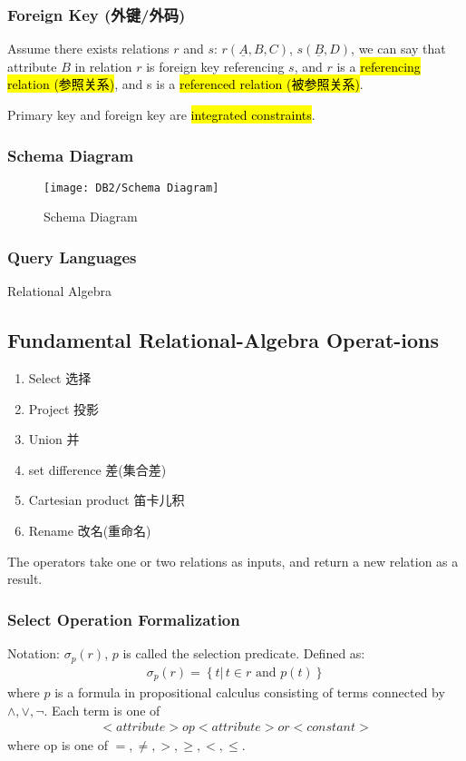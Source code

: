 \subsubsection{Foreign Key (外键/外码)}
Assume there exists relations $r$ and $s$: $r(\underline{A}, B, C)$, $s(\underline{B}, D)$, we can say that attribute $B$ in relation $r$ is foreign key referencing $s$, and $r$ is a \hl{referencing relation (参照关系)}, and s is a \hl{referenced relation (被参照关系)}. 

Primary key and foreign key are \hl{integrated constraints}.

\subsubsection{Schema Diagram}
\begin{figure}[H]
    \centering
    \texttt{[image: DB2/Schema Diagram]}
    \caption{Schema Diagram}
\end{figure}

\subsubsection{Query Languages}
Relational Algebra

\subsection[Fundamental Relational-Algebra Operations]{Fundamental Relational-Algebra Operat-ions}

\begin{enumerate}
    \item Select 选择
    \item Project 投影
    \item Union 并
    \item set difference 差(集合差)
    \item Cartesian product 笛卡儿积
    \item Rename 改名(重命名)
\end{enumerate}
The operators take one or two relations as inputs, and return a new relation as a result. 

\subsubsection{Select Operation Formalization}
Notation: $\sigma_p(r)$, $p$ is called the selection predicate. Defined as: 
\begin{align*}
    \sigma_p(r)=\left\{ t|\, t\in r\text{ and }p(t) \right\}
\end{align*}
where $p$ is a formula in propositional calculus consisting of terms connected by $\land, \lor , \lnot $. Each term is one of
\begin{align*}
    <attribute> op <attribute> or <constant>
\end{align*}
where op is one of $=, \ne, >, \ge, <, \le$. 



